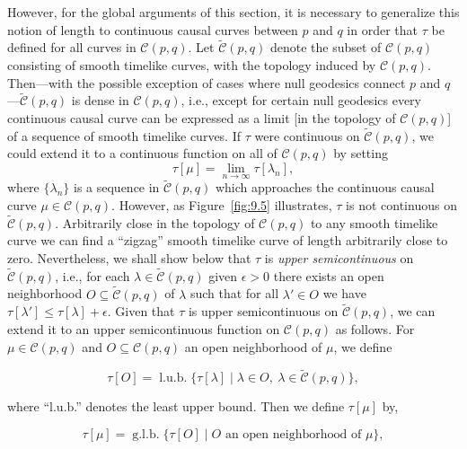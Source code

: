 However, for the global arguments of this section, it is necessary to generalize this
notion of length to continuous causal curves between \(p\) and \(q\) in order that
\(\tau\) be defined for all curves in \(\mathcal C(p,q)\). Let
\(\widetilde{\mathcal C}(p,q)\) denote the subset of \(\mathcal C(p,q)\) consisting of
smooth timelike curves, with the topology induced by \(\mathcal C(p,q)\). Then---with
the possible exception of cases where null geodesics connect \(p\) and
\(q\)---\(\widetilde{\mathcal C}(p,q)\) is dense in \(\mathcal C(p,q)\), i.e., except
for certain null geodesics every continuous causal curve can be expressed as a limit
[in the topology of \(\mathcal C(p,q)\)] of a sequence of smooth timelike curves. If
\(\tau\) were continuous on \(\widetilde{\mathcal C}(p,q)\), we could extend it to a
continuous function on all of \(\mathcal C(p,q)\) by setting
\[
  \tau[\mu]=\lim_{n\to\infty}\tau[\lambda_n] ,
\]
where \(\{\lambda_n\}\) is a sequence in \(\widetilde{\mathcal C}(p,q)\) which
approaches the continuous causal curve \(\mu\in\mathcal C(p,q)\). However, as
Figure~\ref{fig:9.5} illustrates, \(\tau\) is not continuous on
\(\widetilde{\mathcal C}(p,q)\). Arbitrarily close in the topology of
\(\mathcal C(p,q)\) to any smooth timelike curve we can find a ``zigzag'' smooth
timelike curve of length arbitrarily close to zero. Nevertheless, we shall show below
that \(\tau\) is \emph{upper semicontinuous} on \(\widetilde{\mathcal C}(p,q)\), i.e.,
for each \(\lambda\in\widetilde{\mathcal C}(p,q)\) given \(\epsilon>0\) there exists an
open neighborhood \(O\subseteq\widetilde{\mathcal C}(p,q)\) of \(\lambda\) such that for
all \(\lambda'\in O\) we have \(\tau[\lambda']\leq\tau[\lambda]+\epsilon\). Given that
\(\tau\) is upper semicontinuous on \(\widetilde{\mathcal C}(p,q)\), we can extend it
to an upper semicontinuous function on \(\mathcal C(p,q)\) as follows. For
\(\mu\in\mathcal C(p,q)\) and \(O\subseteq\mathcal C(p,q)\) an open neighborhood of
\(\mu\), we define

\begin{equation}
  \tau[O]=\operatorname{l.u.b.}\{\tau[\lambda]\mid
    \lambda\in O,\ \lambda\in\widetilde{\mathcal C}(p,q)\} ,
  \tag{9.4.2}\label{eq:9.4.2}
\end{equation}

where ``l.u.b.'' denotes the least upper bound. Then we define \(\tau[\mu]\) by,

\begin{equation}
  \tau[\mu]=\operatorname{g.l.b.}\{\tau[O]\mid
    O\text{ an open neighborhood of }\mu\} ,
  \tag{9.4.3}\label{eq:9.4.3}
\end{equation}

